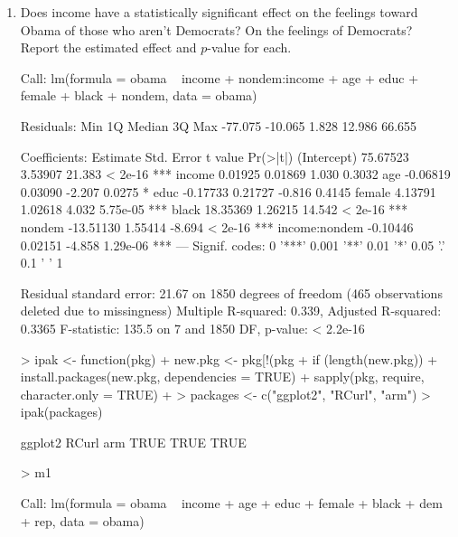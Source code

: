 \documentclass[12pt]{article}
\begin{document}
\begin{enumerate}
\begin{itemize}
\end{itemize}




\item Does income have a statistically significant effect on the feelings toward Obama of those who aren't Democrats?  On the feelings of Democrats?  Report the estimated effect and $p$-value for each.\\

\begin{Schunk}
\begin{Soutput}
Call:
lm(formula = obama ~ income + nondem:income + age + educ + female + 
    black + nondem, data = obama)

Residuals:
    Min      1Q  Median      3Q     Max 
-77.075 -10.065   1.828  12.986  66.655 

Coefficients:
               Estimate Std. Error t value Pr(>|t|)    
(Intercept)    75.67523    3.53907  21.383  < 2e-16 ***
income          0.01925    0.01869   1.030   0.3032    
age            -0.06819    0.03090  -2.207   0.0275 *  
educ           -0.17733    0.21727  -0.816   0.4145    
female          4.13791    1.02618   4.032 5.75e-05 ***
black          18.35369    1.26215  14.542  < 2e-16 ***
nondem        -13.51130    1.55414  -8.694  < 2e-16 ***
income:nondem  -0.10446    0.02151  -4.858 1.29e-06 ***
---
Signif. codes:  0 '***' 0.001 '**' 0.01 '*' 0.05 '.' 0.1 ' ' 1

Residual standard error: 21.67 on 1850 degrees of freedom
  (465 observations deleted due to missingness)
Multiple R-squared:  0.339,	Adjusted R-squared:  0.3365 
F-statistic: 135.5 on 7 and 1850 DF,  p-value: < 2.2e-16
\end{Soutput}
\begin{Sinput}
> ipak <- function(pkg){
+     new.pkg <- pkg[!(pkg %in% installed.packages()[, "Package"])]
+     if (length(new.pkg)) 
+         install.packages(new.pkg, dependencies = TRUE)
+     sapply(pkg, require, character.only = TRUE)
+ }
> packages <- c("ggplot2", "RCurl", "arm")
> ipak(packages)
\end{Sinput}
\begin{Soutput}
ggplot2   RCurl     arm 
   TRUE    TRUE    TRUE 
\end{Soutput}
\begin{Sinput}
> m1
\end{Sinput}
\begin{Soutput}
Call:
lm(formula = obama ~ income + age + educ + female + black + dem + 
    rep, data = obama)


\end{Soutput}
\end{Schunk}
\end{enumerate}
\end{document}
